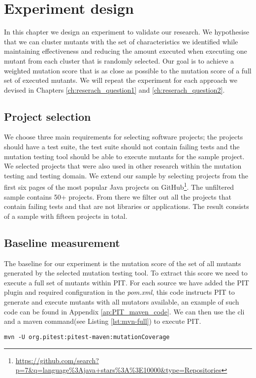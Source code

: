 \documentclass[../main]{subfiles}
\begin{document}
\chapter{Experiment design}
In this chapter we design an experiment to validate our research.
We hypothesise that we can cluster mutants with the set of characteristics we identified
while maintaining effectiveness and reducing the amount executed when executing one mutant from each cluster that is randomly selected.
Our goal is to achieve a weighted mutation score that is as close as possible to the mutation score of a full set of executed mutants.
We will repeat the experiment for each approach we devised in Chapters \ref{ch:reserach_question1} and \ref{ch:reserach_question2}.

\section{Project selection}
\label{ch:project_selection}
We choose three main requirements for selecting software projects; the projects should have a test suite, the test suite should not contain failing tests and the mutation testing tool should be able to execute mutants for the sample project.
We selected projects that were also used in other research within the mutation testing and testing domain\cite{Pizzoleto2019,Yu2019PossibilityScope,Wei2021SpectralTesting, Zhang2019PredictiveTesting, Chen2018SpeedingStudy, Laurent2017AssessingPIT}.
\newline
We extend our sample by selecting projects from the first six pages of the most popular Java projects on GitHub\footnote{\url{https://github.com/search?p=7&q=language\%3Ajava+stars\%3A\%3E10000&type=Repositories}}.
The unfiltered sample contains 50+ projects.
From there we filter out all the projects that contain failing tests and that are not libraries or applications.
The result consists of a sample with fifteen projects in total.

\section{Baseline measurement}
The baseline for our experiment is the mutation score of the set of all mutants generated by the selected mutation testing tool.
To extract this score we need to execute a full set of mutants within PIT.
For each source we have added the PIT plugin and required configuration in the \textit{pom.xml}, this code instructs PIT to generate and execute mutants with all mutators available, an example of such code can be found in Appendix \ref{ap:PIT_maven_code}.
We can then use the \acrfull{cli} and a maven command(see Listing \ref{lst:mvn-full}) to execute PIT.
\begin{lstlisting}[label=lst:mvn-full,caption=Command used to execute full set of mutants with PIT.]
mvn -U org.pitest:pitest-maven:mutationCoverage
\end{lstlisting}
\end{document}
